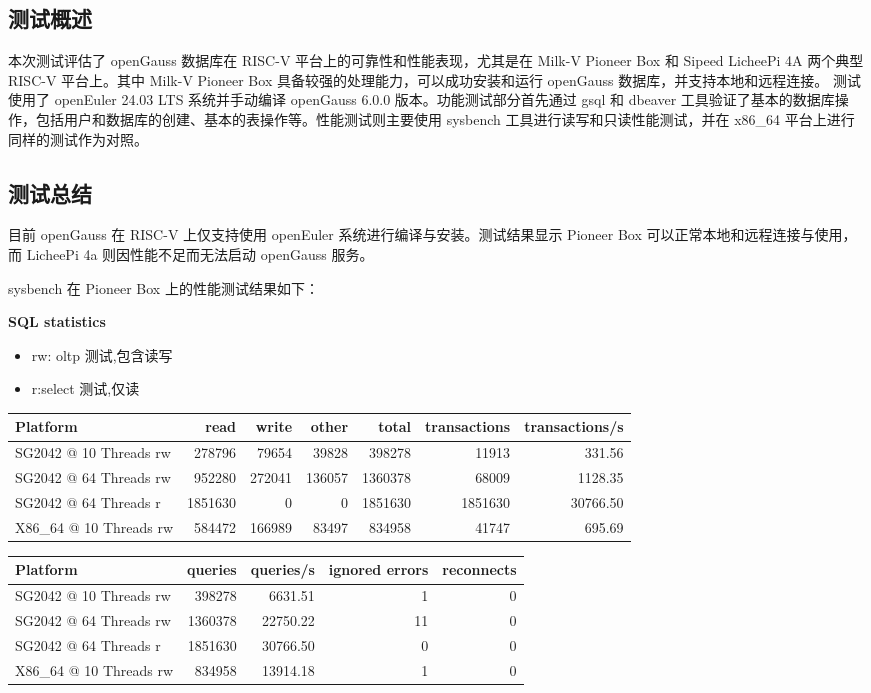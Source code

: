 \documentclass{article}
\begin{document}
\subsection{测试概述}
本次测试评估了 openGauss 数据库在 RISC-V 平台上的可靠性和性能表现，尤其是在 Milk-V Pioneer Box 和 Sipeed LicheePi 4A 两个典型 RISC-V 平台上。其中 Milk-V Pioneer Box 具备较强的处理能力，可以成功安装和运行 openGauss 数据库，并支持本地和远程连接。
测试使用了 openEuler 24.03 LTS 系统并手动编译 openGauss 6.0.0 版本。功能测试部分首先通过 gsql 和 dbeaver 工具验证了基本的数据库操作，包括用户和数据库的创建、基本的表操作等。性能测试则主要使用 sysbench 工具进行读写和只读性能测试，并在 x86\_64 平台上进行同样的测试作为对照。

\subsection{测试总结}
目前 openGauss 在 RISC-V 上仅支持使用 openEuler 系统进行编译与安装。测试结果显示 Pioneer Box 可以正常本地和远程连接与使用，而 LicheePi 4a 则因性能不足而无法启动 openGauss 服务。

sysbench 在 Pioneer Box 上的性能测试结果如下：

\textbf{SQL statistics}

\begin{itemize}
    \item rw: oltp 测试,包含读写 
    \item r:select 测试,仅读
\end{itemize}

\begin{table}[h]
\centering
\begin{tabular}{|l|r|r|r|r|r|r|}
\hline
Platform & read & write & other & total & transactions & transactions/s \\
\hline
SG2042 @ 10 Threads rw & 278796 & 79654 & 39828 & 398278 & 11913 & 331.56 \\
SG2042 @ 64 Threads rw & 952280 & 272041 & 136057 & 1360378 & 68009 & 1128.35 \\
SG2042 @ 64 Threads r  & 1851630 & 0      & 0      & 1851630 & 1851630 & 30766.50 \\
X86\_64 @ 10 Threads rw & 584472 & 166989 & 83497 & 834958 & 41747 & 695.69 \\
\hline
\end{tabular}
\end{table}

\begin{table}[h]
\centering
\begin{tabular}{|l|r|r|r|r|}
\hline
Platform & queries & queries/s & ignored errors & reconnects \\
\hline
SG2042 @ 10 Threads rw & 398278 & 6631.51 & 1 & 0 \\
SG2042 @ 64 Threads rw & 1360378 & 22750.22 & 11 & 0 \\
SG2042 @ 64 Threads r  & 1851630 & 30766.50 & 0 & 0 \\
X86\_64 @ 10 Threads rw & 834958 & 13914.18 & 1 & 0 \\
\hline
\end{tabular}
\end{table}
\end{document}
